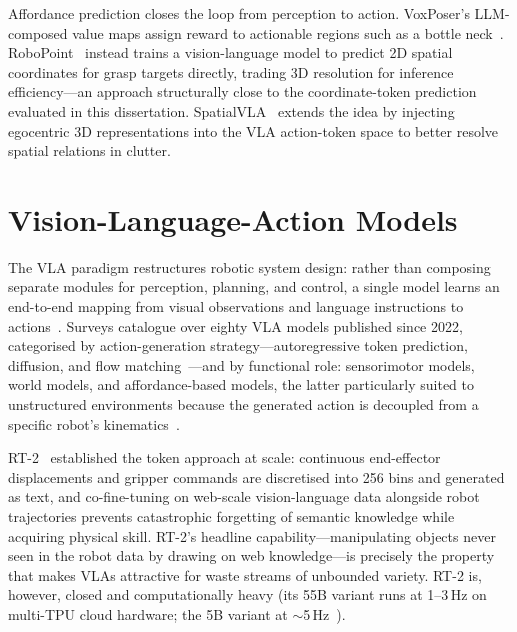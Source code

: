 Affordance prediction closes the loop from perception to action. VoxPoser's LLM-composed value maps assign reward to actionable regions such as a bottle neck~\citep{huang2023}. RoboPoint~\citep{yuan2024} instead trains a vision-language model to predict 2D spatial coordinates for grasp targets directly, trading 3D resolution for inference efficiency---an approach structurally close to the coordinate-token prediction evaluated in this dissertation. SpatialVLA~\citep{qu2025} extends the idea by injecting egocentric 3D representations into the VLA action-token space to better resolve spatial relations in clutter.

\section{Vision-Language-Action Models}
\label{sec:lit_vla}

The VLA paradigm restructures robotic system design: rather than composing separate modules for perception, planning, and control, a single model learns an end-to-end mapping from visual observations and language instructions to actions~\citep{sapkota2025, kawaharazuka2025}. Surveys catalogue over eighty VLA models published since 2022, categorised by action-generation strategy---autoregressive token prediction, diffusion, and flow matching~\citep{ma2024, li2025survey, zhong2025}---and by functional role: sensorimotor models, world models, and affordance-based models, the latter particularly suited to unstructured environments because the generated action is decoupled from a specific robot's kinematics~\citep{kawaharazuka2025}.

RT-2~\citep{zitkovich2023} established the token approach at scale: continuous end-effector displacements and gripper commands are discretised into 256 bins and generated as text, and co-fine-tuning on web-scale vision-language data alongside robot trajectories prevents catastrophic forgetting of semantic knowledge while acquiring physical skill. RT-2's headline capability---manipulating objects never seen in the robot data by drawing on web knowledge---is precisely the property that makes VLAs attractive for waste streams of unbounded variety. RT-2 is, however, closed and computationally heavy (its 55B variant runs at 1--3\,Hz on multi-TPU cloud hardware; the 5B variant at $\sim$5\,Hz~\citep{zitkovich2023}).

